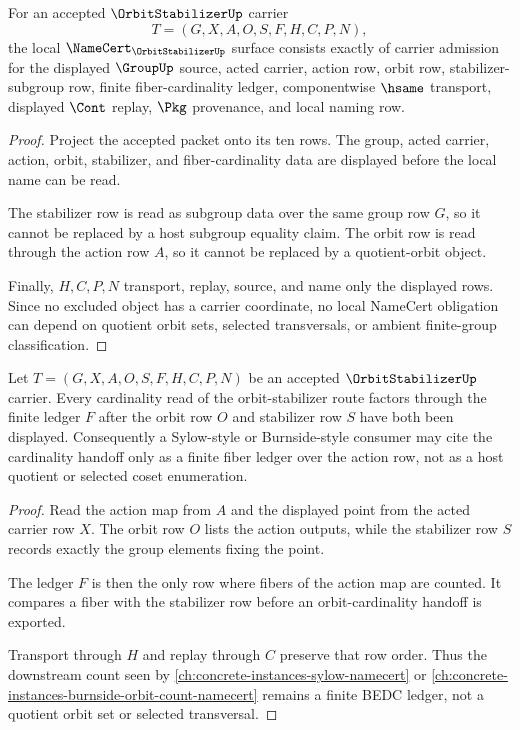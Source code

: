 \begin{theorem}
\label{thm:orbit-stabilizer-namecert-obligations}
For an accepted $\OrbitStabilizerUp$ carrier
$$
T=(G,X,A,O,S,F,H,C,P,N),
$$
the local $\NameCert_{\OrbitStabilizerUp}$ surface consists exactly of carrier admission for the displayed $\GroupUp$ source, acted carrier, action row, orbit row, stabilizer-subgroup row, finite fiber-cardinality ledger, componentwise $\hsame$ transport, displayed $\Cont$ replay, $\Pkg$ provenance, and local naming row.
\end{theorem}
\begin{proof}
Project the accepted packet onto its ten rows. The group, acted carrier, action, orbit, stabilizer, and fiber-cardinality data are displayed before the local name can be read.

The stabilizer row is read as subgroup data over the same group row $G$, so it cannot be replaced by a host subgroup equality claim. The orbit row is read through the action row $A$, so it cannot be replaced by a quotient-orbit object.

Finally, $H,C,P,N$ transport, replay, source, and name only the displayed rows. Since no excluded object has a carrier coordinate, no local NameCert obligation can depend on quotient orbit sets, selected transversals, or ambient finite-group classification.
\end{proof}

\begin{theorem}
\label{thm:orbit-stabilizer-fiber-cardinality-handoff}
Let $T=(G,X,A,O,S,F,H,C,P,N)$ be an accepted $\OrbitStabilizerUp$ carrier. Every cardinality read of the orbit-stabilizer route factors through the finite ledger $F$ after the orbit row $O$ and stabilizer row $S$ have both been displayed. Consequently a Sylow-style or Burnside-style consumer may cite the cardinality handoff only as a finite fiber ledger over the action row, not as a host quotient or selected coset enumeration.
\end{theorem}
\begin{proof}
Read the action map from $A$ and the displayed point from the acted carrier row $X$. The orbit row $O$ lists the action outputs, while the stabilizer row $S$ records exactly the group elements fixing the point.

The ledger $F$ is then the only row where fibers of the action map are counted. It compares a fiber with the stabilizer row before an orbit-cardinality handoff is exported.

Transport through $H$ and replay through $C$ preserve that row order. Thus the downstream count seen by \autoref{ch:concrete-instances-sylow-namecert} or \autoref{ch:concrete-instances-burnside-orbit-count-namecert} remains a finite BEDC ledger, not a quotient orbit set or selected transversal.
\end{proof}

